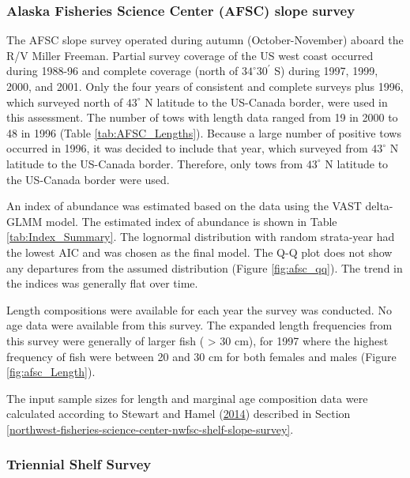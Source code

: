 \documentclass[12pt,]{article}
\begin{document}
\subsubsection{Alaska Fisheries Science Center (AFSC) slope
survey}\label{alaska-fisheries-science-center-afsc-slope-survey}

The AFSC slope survey operated during autumn (October-November) aboard
the R/V Miller Freeman. Partial survey coverage of the US west coast
occurred during 1988-96 and complete coverage (north of
\(34^\circ 30^\prime\) S) during 1997, 1999, 2000, and 2001. Only the
four years of consistent and complete surveys plus 1996, which surveyed
north of \(43^\circ\) N latitude to the US-Canada border, were used in
this assessment. The number of tows with length data ranged from 19 in
2000 to 48 in 1996 (Table \ref{tab:AFSC_Lengths}). Because a large
number of positive tows occurred in 1996, it was decided to include that
year, which surveyed from \(43^\circ\) N latitude to the US-Canada
border. Therefore, only tows from \(43^\circ\) N latitude to the
US-Canada border were used.

An index of abundance was estimated based on the data using the VAST
delta-GLMM model. The estimated index of abundance is shown in Table
\ref{tab:Index_Summary}. The lognormal distribution with random
strata-year had the lowest AIC and was chosen as the final model. The
Q-Q plot does not show any departures from the assumed distribution
(Figure \ref{fig:afsc_qq}). The trend in the indices was generally flat
over time.

Length compositions were available for each year the survey was
conducted. No age data were available from this survey. The expanded
length frequencies from this survey were generally of larger fish (
\textgreater{} 30 cm), for 1997 where the highest frequency of fish were
between 20 and 30 cm for both females and males (Figure
\ref{fig:afsc_Length}).

The input sample sizes for length and marginal age composition data were
calculated according to Stewart and Hamel
(\protect\hyperlink{ref-stewart_bootstrapping_2014}{2014}) described in
Section
\ref{northwest-fisheries-science-center-nwfsc-shelf-slope-survey}.

\subsubsection{Triennial Shelf Survey}\label{triennial-shelf-survey}
\end{document}
